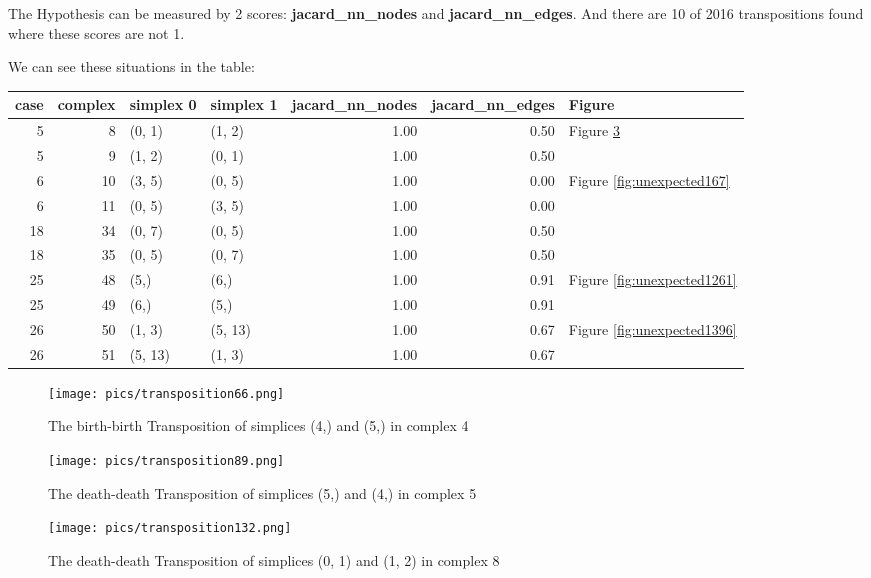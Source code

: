 \documentclass{article}
\begin{document}
\par The Hypothesis can be measured by 2 scores: \textbf{jacard\_nn\_nodes} and \textbf{jacard\_nn\_edges}.
And there are 10 of 2016 transpositions found where these scores are not 1.
\par We can see these situations in the table:
\begin{center}\begin{tabular}{rrllrrl}
\toprule
case & complex & simplex 0 & simplex 1 & jacard\_nn\_nodes & jacard\_nn\_edges & Figure \\
\midrule
5 & 8 & (0, 1) & (1, 2) & 1.00 & 0.50 & Figure \ref{fig:unexpected132} \\
5 & 9 & (1, 2) & (0, 1) & 1.00 & 0.50 &  \\
6 & 10 & (3, 5) & (0, 5) & 1.00 & 0.00 & Figure \ref{fig:unexpected167} \\
6 & 11 & (0, 5) & (3, 5) & 1.00 & 0.00 &  \\
18 & 34 & (0, 7) & (0, 5) & 1.00 & 0.50 &  \\
18 & 35 & (0, 5) & (0, 7) & 1.00 & 0.50 &  \\
25 & 48 & (5,) & (6,) & 1.00 & 0.91 & Figure \ref{fig:unexpected1261} \\
25 & 49 & (6,) & (5,) & 1.00 & 0.91 &  \\
26 & 50 & (1, 3) & (5, 13) & 1.00 & 0.67 & Figure \ref{fig:unexpected1396} \\
26 & 51 & (5, 13) & (1, 3) & 1.00 & 0.67 &  \\
\bottomrule
\end{tabular}
\end{center}


\begin{figure}[ht]
\centering
\texttt{[image: pics/transposition66.png]}
\caption{The birth-birth Transposition of simplices (4,) and (5,) in complex 4}
\label{fig:unexpected66}
\end{figure}

\begin{figure}[ht]
\centering
\texttt{[image: pics/transposition89.png]}
\caption{The death-death Transposition of simplices (5,) and (4,) in complex 5}
\label{fig:unexpected89}
\end{figure}

\begin{figure}[ht]
\centering
\texttt{[image: pics/transposition132.png]}
\caption{The death-death Transposition of simplices (0, 1) and (1, 2) in complex 8}
\label{fig:unexpected132}
\end{figure}
\end{document}
